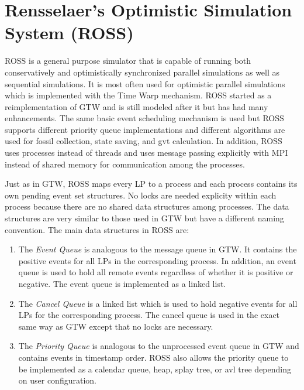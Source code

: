 \documentclass[11pt]{book}
\begin{document}
\section{Rensselaer's Optimistic Simulation System (ROSS)}

ROSS\cite{carothers-00} is a general purpose simulator that is capable of running both
conservatively and optimistically synchronized parallel simulations as well as sequential
simulations.  It is most often used for optimistic parallel simulations which is implemented
with the Time Warp mechanism.  ROSS started as a reimplementation of GTW and is still
modeled after it but has had many enhancements.  The same basic event scheduling mechanism is
used but ROSS supports different priority queue implementations and different algorithms
are used for fossil collection, state saving, and gvt calculation.  In addition, ROSS uses
processes instead of threads and uses message passing explicitly with MPI instead of shared
memory for communication among the processes.

Just as in GTW, ROSS maps every LP to a process and each process contains its own pending
event set structures.  No locks are needed explicity within each process because there are
no shared data structures among processes.  The data structures are very similar to those
used in GTW but have a different naming convention.  The main data structures in ROSS are:

\begin{enumerate}
    \item The \emph{Event Queue} is analogous to the message queue in GTW.  It contains the
        positive events for all LPs in the corresponding process.  In addition, an event
        queue is used to hold all remote events regardless of whether it is positive or
        negative.  The event queue is implemented as a linked list.
    \item The \emph{Cancel Queue} is a linked list which is used to hold negative events
        for all LPs for the corresponding process.  The cancel queue is used in the exact
        same way as GTW except that no locks are necessary.
    \item The \emph{Priority Queue} is analogous to the unprocessed event queue in GTW and
        contains events in timestamp order.  ROSS also allows the priority queue to be
        implemented as a calendar queue, heap, splay tree, or avl tree depending on user
        configuration.
\end{enumerate}
\end{document}

